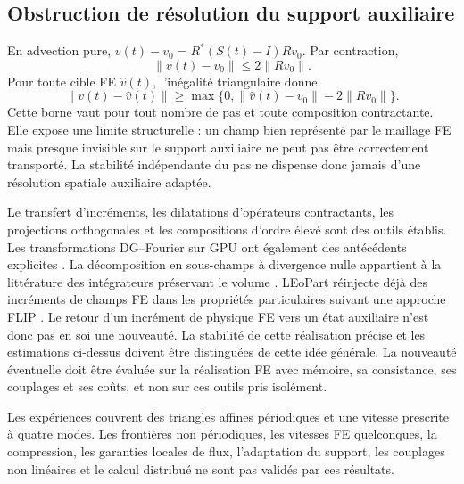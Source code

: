 \documentclass[11pt,a4paper]{article}
\begin{document}
\subsection*{Obstruction de résolution du support auxiliaire}
En advection pure, $v(t)-v_0=R^*(S(t)-I)Rv_0$. Par contraction,
\[
\|v(t)-v_0\|\leq 2\|Rv_0\|.
\]
Pour toute cible FE $\widehat v(t)$, l'inégalité triangulaire donne
\[
\|v(t)-\widehat v(t)\|\geq
\max\{0,\|\widehat v(t)-v_0\|-2\|Rv_0\|\}.
\]
Cette borne vaut pour tout nombre de pas et toute composition contractante.
Elle expose une limite structurelle : un champ bien représenté par le
maillage FE mais presque invisible sur le support auxiliaire ne peut pas
être correctement transporté. La stabilité indépendante du pas ne dispense
donc jamais d'une résolution spatiale auxiliaire adaptée.

Le transfert d'incréments, les dilatations d'opérateurs contractants,
les projections orthogonales et les compositions d'ordre élevé sont
des outils établis. Les transformations DG--Fourier sur GPU ont également
des antécédents explicites \cite{crews}. La décomposition en sous-champs
à divergence nulle appartient à la littérature des intégrateurs
préservant le volume \cite{xue}.
LEoPart réinjecte déjà des incréments de champs FE dans les propriétés
particulaires suivant une approche FLIP \cite{leopart}. Le retour d'un
incrément de physique FE vers un état auxiliaire n'est donc pas en soi
une nouveauté. La stabilité de cette réalisation précise et les estimations
ci-dessus doivent être distinguées de cette idée générale.
La nouveauté éventuelle doit être évaluée sur la réalisation FE avec
mémoire, sa consistance, ses couplages et ses coûts, et non sur ces outils
pris isolément.

Les expériences couvrent des triangles affines périodiques et une vitesse
prescrite à quatre modes. Les frontières non périodiques, les vitesses FE
quelconques, la compression, les garanties locales de flux, l'adaptation
du support, les couplages non linéaires et le calcul distribué ne sont pas
validés par ces résultats.
\end{document}
